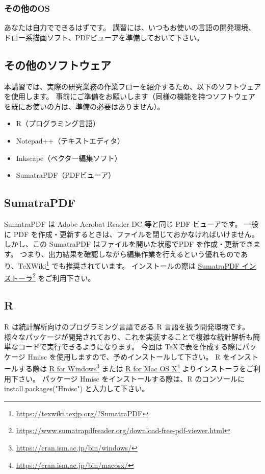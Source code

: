 \documentclass[TeXworkshop]{subfiles}
\begin{document}
\subsubsection*{その他のOS}
あなたは自力でできるはずです。
講習には、いつもお使いの言語の開発環境、ドロー系描画ソフト、PDFビューアを準備しておいて下さい。

\subsection*{その他のソフトウェア}
本講習では、実際の研究業務の作業フローを紹介するため、以下のソフトウェアを使用します。
事前にご準備をお願いします（同様の機能を持つソフトウェアを既にお使いの方は、準備の必要はありません）。
\begin{itemize}
\item R（プログラミング言語）
\item Notepad++（テキストエディタ）
\item Inkscape（ベクター編集ソフト）
\item SumatraPDF（PDFビューア）
\end{itemize}
\subsection*{SumatraPDF}
SumatraPDF は Adobe Acrobat Reader DC 等と同じ PDF ビューアです。
一般に PDF を作成・更新するときは、ファイルを閉じておかなければいけません。
しかし、この SumatraPDF はファイルを開いた状態でPDF を作成・更新できます。
つまり、出力結果を確認しながら編集作業を行えるという優れものであり、\TeX Wiki\footnote{\url{https://texwiki.texjp.org/?SumatraPDF}} でも推奨されています。
インストールの際は \href{https://www.sumatrapdfreader.org/download-free-pdf-viewer.html}{SumatraPDF インストーラ}\footnote{\url{https://www.sumatrapdfreader.org/download-free-pdf-viewer.html}} をご利用下さい。

\subsection*{R}
R は統計解析向けのプログラミング言語である R 言語を扱う開発環境です。
様々なパッケージが開発されており、これを実装することで複雑な統計解析も簡単なコードで実行できるようになります。
今回は \TeX で表を作成する際にパッケージ Hmisc を使用しますので、予めインストールして下さい。
R をインストールする際は \href{https://cran.ism.ac.jp/bin/windows/}{R for Windows}\footnote{\url{https://cran.ism.ac.jp/bin/windows/}} または \href{https://cran.ism.ac.jp/bin/macosx/}{R for Mac OS X}\footnote{\url{https://cran.ism.ac.jp/bin/macosx/}} よりインストーラをご利用下さい。
パッケージ Hmisc をインストールする際は、R のコンソールに install.packages("Hmisc") と入力して下さい。
\end{document}
